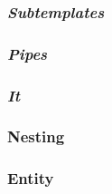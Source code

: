 \documentclass[../relatorio.tex]{subfiles}
\begin{document}
\subsubsection{\textit{Subtemplates}} \label{subsec:subt}


\subsubsection{\textit{Pipes}} \label{subsec:pipes}


\subsubsection{\textit{It}}\label{subsec:it}


\subsubsection{Nesting}
 \label{subsec:nest}

\subsubsection{Entity}
 \label{subsec:entity}
\end{document}
